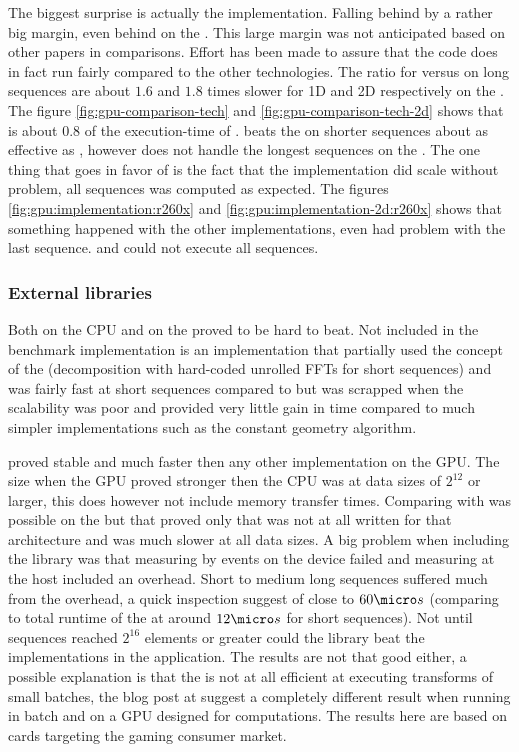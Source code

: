 The biggest surprise is actually the {\OCL} implementation. Falling behind by a rather big margin, even behind on the \AMDCARD. This large margin was not anticipated based on other papers in comparisons. Effort has been made to assure that the code does in fact run fairly compared to the other technologies. The ratio for {\OCL} versus {\CU} on long sequences are about $1.6$ and $1.8$ times slower for 1D and 2D respectively on the {\NVCARD}. The figure \ref{fig:gpu-comparison-tech} and \ref{fig:gpu-comparison-tech-2d} shows that {\DX} is about $0.8$ of the execution-time of {\OCL}. {\GL} beats the {\OCL} on shorter sequences about as effective as {\DX}, however does not handle the longest sequences on the {\AMDCARD}. The one thing that goes in favor of {\OCL} is the fact that the implementation did scale without problem, all sequences was computed as expected. The figures \ref{fig:gpu:implementation:r260x} and \ref{fig:gpu:implementation-2d:r260x} shows that something happened with the other implementations, even {\CLFFT} had problem with the last sequence. {\GL} and {\DX} could not execute all sequences.

\subsubsection{External libraries}

Both {\FFTW} on the CPU and {\CUFFT} on the {\NVCARD} proved to be hard to beat. Not included in the benchmark implementation is an {\CPP} implementation that partially used the concept of the {\FFTW} (decomposition with hard-coded unrolled FFTs for short sequences) and was fairly fast at short sequences compared to {\FFTW} but was scrapped when the scalability was poor and provided very little gain in time compared to much simpler implementations such as the constant geometry algorithm.

{\CUFFT} proved stable and much faster then any other implementation on the GPU. The size when the GPU proved stronger then the CPU was at data sizes of $2^{12}$ or larger, this does however not include memory transfer times. Comparing {\CUFFT} with {\CLFFT} was possible on the {\NVCARD} but that proved only that {\CLFFT} was not at all written for that architecture and was much slower at all data sizes. A big problem when including the {\CLFFT} library was that measuring by events on the device failed and measuring at the host included an overhead. Short to medium long sequences suffered much from the overhead, a quick inspection suggest of close to $60{\micro}s$ (comparing to total runtime of the {\OCL} at around $12{\micro}s$ for short sequences). Not until sequences reached $2^{16}$ elements or greater could the library beat the implementations in the application. The results are not that good either, a possible explanation is that the {\CLFFT} is not at all efficient at executing transforms of small batches, the blog post at \cite{amd2015performance} suggest a completely different result when running in batch and on a GPU designed for computations. The results here are based on cards targeting the gaming consumer market.

